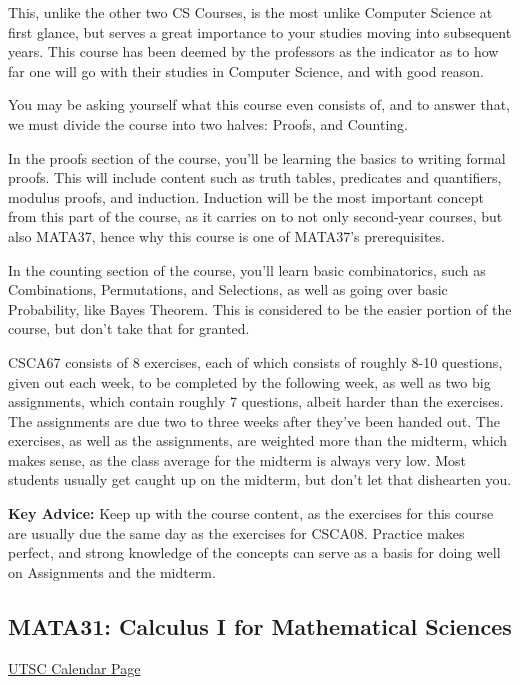 \documentclass[11pt]{article}
\begin{document}
This, unlike the other two CS Courses, is the most unlike Computer Science at first glance, but serves a great importance to your studies moving into subsequent years.  This course has been deemed by the professors as the indicator as to how far one will go with their studies in Computer Science, and with good reason.\par
You may be asking yourself what this course even consists of, and to answer that, we must divide the course into two halves: Proofs, and Counting.\par
In the proofs section of the course, you'll be learning the basics to writing formal proofs.  This will include content such as truth tables, predicates and quantifiers, modulus proofs, and induction.  Induction will be the most important concept from this part of the course, as it carries on to not only second-year courses, but also MATA37, hence why this course is one of MATA37's prerequisites. \par
In the counting section of the course, you'll learn basic combinatorics, such as Combinations, Permutations, and Selections, as well as going over basic Probability, like Bayes Theorem.  This is considered to be the easier portion of the course, but don't take that for granted. \par
CSCA67 consists of 8 exercises, each of which consists of roughly 8-10 questions, given out each week, to be completed by the following week, as well as two big assignments, which contain roughly 7 questions, albeit harder than the exercises.  The assignments are due two to three weeks after they've been handed out.  The exercises, as well as the assignments, are weighted more than the midterm, which makes sense, as the class average for the midterm is always very low.  Most students usually get caught up on the midterm, but don't let that dishearten you.\par
\textbf{Key Advice:} Keep up with the course content, as the exercises for this course are usually due the same day as the exercises for CSCA08.  Practice makes perfect, and strong knowledge of the concepts can serve as a basis for doing well on Assignments and the midterm.

\subsection{MATA31: Calculus I for Mathematical Sciences}

\href{https://utsc.calendar.utoronto.ca/course/MATA31H3}{UTSC Calendar Page}\\
\end{document}
